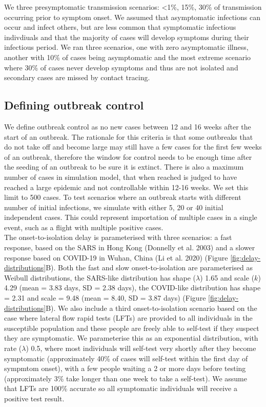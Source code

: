 \documentclass{article}
\begin{document}
We three presymptomatic transmission scenarios: <1\%, 15\%, 30\% of transmission occurring prior to symptom onset. %
We assumed that asymptomatic infections can occur and infect others, but are less common that symptomatic infectious indivdiuals and that the majority of cases will develop symptoms during their infectious period.  We ran three scenarios, one with zero asymptomatic illness, another with 10\% of cases being asymptomatic and the most extreme scenario where 30\% of cases never develop symptoms and thus are not isolated and secondary cases are missed by contact tracing.

\subsection*{Defining outbreak control}

We define outbreak control as no new cases between 12 and 16 weeks after the start of an outbreak\cite{hellewellFeasibilityControllingCOVID192020}. The rationale for this criteria is that some outbreaks that do not take off and become large may still have a few cases for the first few weeks of an outbreak, therefore the window for control needs to be enough time after the seeding of an outbreak to be sure it is extinct. There is also a maximum number of cases in simulation model, that when reached is judged to have reached a large epidemic and not controllable within 12-16 weeks. We set this limit to 500 cases. To test scenarios where an outbreak starts with different number of initial infections, we simulate with either 5, 20 or 40 initial independent cases. This could represent importation of multiple cases in a single event, such as a flight with multiple positive cases. \\


The onset-to-isolation delay is parameterised with three scenarios: a fast response, based on the SARS in Hong Kong (Donnelly et al. 2003) and a slower response based on COVID-19 in Wuhan, China (Li et al. 2020) (Figure \ref{fig:delay-distributions}B). Both the fast and slow onset-to-isolation are parameterised as Weibull distributions, the SARS-like distribution has shape ($\lambda$) 1.65 and scale ($k$) 4.29 (mean = 3.83 days, SD = 2.38 days), the COVID-like distribution has shape = 2.31 and scale = 9.48 (mean = 8.40, SD = 3.87 days) (Figure \ref{fig:delay-distributions}B). We also include a third onset-to-isolation scenario based on the case where lateral flow rapid tests (LFTs) are provided to all individuals in the susceptible population and these people are freely able to self-test if they suspect they are symptomatic. We parameterise this as an exponential distribution, with rate ($\lambda$) 0.5, where most individuals will self-test very shortly after they become symptomatic (approximately 40\% of cases will self-test within the first day of sympmtom onset), with a few people waiting a 2 or more days before testing (approximately 3\% take longer than one week to take a self-test). We assume that LFTs are 100\% accurate so all symptomatic individuals will receive a positive test result. 
\end{document}
